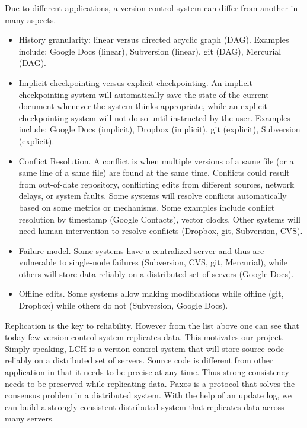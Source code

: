 \documentclass[11pt]{article}
\begin{document}
Due to different applications, a version control system can differ from another in many aspects.
\begin{itemize}
    \item History granularity: linear versus directed acyclic graph (DAG).
        Examples include: Google Docs (linear), Subversion (linear), git (DAG), Mercurial (DAG).
    \item Implicit checkpointing versus explicit checkpointing.
        An implicit checkpointing system will automatically save the state of the current document whenever the system thinks appropriate, while an explicit checkpointing system will not do so until instructed by the user.
        Examples include: Google Docs (implicit), Dropbox (implicit), git (explicit), Subversion (explicit).
    \item Conflict Resolution.
        A conflict is when multiple versions of a same file (or a same line of a same file) are found at the same time.
        Conflicts could result from out-of-date repository, conflicting edits from different sources, network delays, or system faults.
        Some systems will resolve conflicts automatically based on some metrics or mechanisms.
        Some examples include conflict resolution by timestamp (Google Contacts), vector clocks.
        Other systems will need human intervention to resolve conflicts (Dropbox, git, Subversion, CVS).
    \item Failure model.
        Some systems have a centralized server and thus are vulnerable to single-node failures (Subversion, CVS, git, Mercurial\footnotemark),
        while others will store data reliably on a distributed set of servers (Google Docs).
    \item Offline edits.
        Some systems allow making modifications while offline (git, Dropbox) while others do not (Subversion, Google Docs).
\end{itemize}

Replication is the key to reliability.
However from the list above one can see that today few version control system replicates data.
This motivates our project.
Simply speaking, LCH is a version control system that will store source code reliably on a distributed set of servers.
Source code is different from other application in that it needs to be precise at any time.
Thus strong consistency needs to be preserved while replicating data.
Paxos\cite{paxos} is a protocol that solves the consensus problem in a distributed system.
With the help of an update log, we can build a strongly consistent distributed system that replicates data across many servers.
\end{document}
